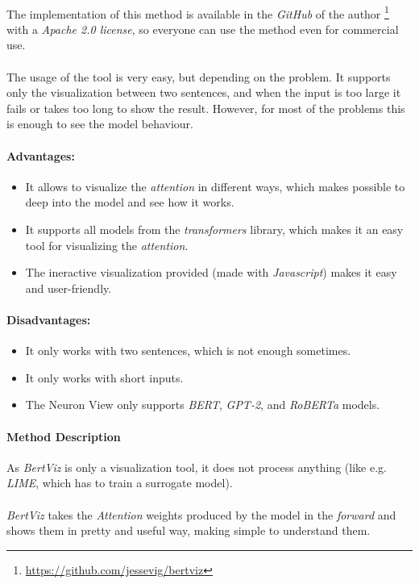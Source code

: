 \paragraph{}
The implementation of this method is available in the \emph{GitHub} of the author \footnote{\url{https://github.com/jessevig/bertviz}} with a \emph{Apache 2.0 license}, so everyone can use the method even for commercial use. 
\paragraph{}
The usage of the tool is very easy, but depending on the problem. It supports only the visualization between two sentences, and when the input is too large it fails or takes too long to show the result. However, for most of the problems this is enough to see the model behaviour.
\paragraph{Advantages:}
\begin{itemize}
	\item It allows to visualize the \emph{attention} in different ways, which makes possible to deep into the model and see how it works.
	\item It supports all models from the \emph{transformers} library, which makes it an easy tool for visualizing the \emph{attention}.
	\item The ineractive visualization provided (made with \emph{Javascript}) makes it easy and user-friendly.
\end{itemize}
\paragraph{Disadvantages:}
\begin{itemize}
	\item It only works with two sentences, which is not enough sometimes.
	\item It only works with short inputs.
	\item The Neuron View only supports \emph{BERT}, \emph{GPT-2}, and \emph{RoBERTa} models.
\end{itemize}
\paragraph{Method Description} 
As \emph{BertViz} is only a visualization tool, it does not process anything (like e.g. \emph{LIME}, which has to train a surrogate model).
\paragraph{}
\emph{BertViz} takes the \emph{Attention} weights produced by the model in the \emph{forward} and shows them in pretty and useful way, making simple to understand them. 
